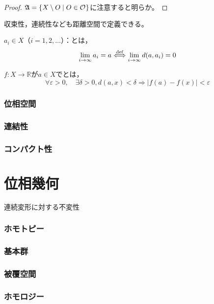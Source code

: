 \documentclass[uplatex]{jsarticle}
\newcommand{\octopuspart}[1]{\newpage\part{#1}\setcounter{section}{0}\vspace{3\baselineskip}}
\begin{document}
\begin{proof}
     $\mathfrak{A} = \Set{\hspace{-1.8pt}  X \setminus O | O \in \mathcal{O} \hspace{-1.8pt}}$に注意すると明らか。


\end{proof}

収束性，連続性なども距離空間で定義できる。

\begin{teigi}
     $a_{i} \in X$（$i=1,2,\dots$）：とは，
    \begin{equation}
        \lim_{i \to \infty} a_{i} = a \overset{\mathrm{def}}{\Longleftrightarrow} \lim_{i \to \infty} d(a, a_{i}) = 0
    \end{equation}
    
     $f:X \longrightarrow \mathbb{R}$が$a \in X$でとは，
    \begin{equation}
        \forall \varepsilon > 0, \quad \exists \delta > 0, d(a,x) < \delta \Longrightarrow \left| f(a) - f(x) \right| < \varepsilon
    \end{equation}
\end{teigi}

\section{位相空間}
\section{連結性}
\section{コンパクト性}

\octopuspart{位相幾何}
連続変形に対する不変性

\section{ホモトピー}
\section{基本群}
\section{被覆空間}
\section{ホモロジー}
\end{document}
